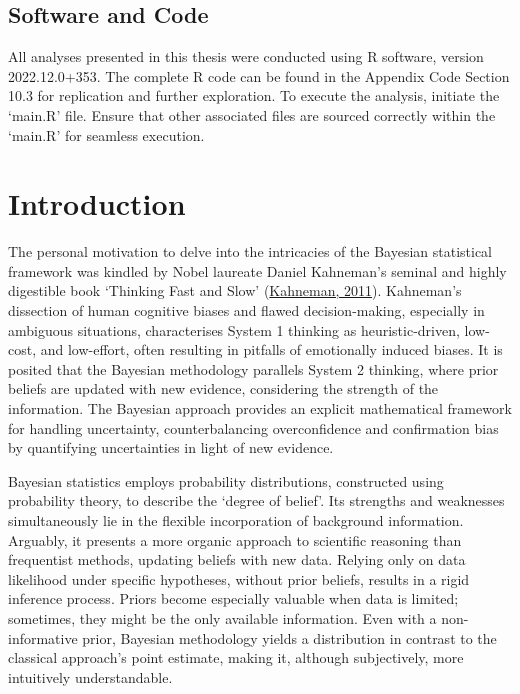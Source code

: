 \documentclass[
  11pt,
]{article}
\begin{document}
\newpage

\subsection*{\LARGE Software and Code}

All analyses presented in this thesis were conducted using R software,
version 2022.12.0+353. The complete R code can be found in the Appendix
Code Section 10.3 for replication and further exploration. To execute
the analysis, initiate the `main.R' file. Ensure that other associated
files are sourced correctly within the `main.R' for seamless execution.

\newpage

\tableofcontents

\newpage

\listoffigures

\newpage

\listoftables

\newpage

\section{Introduction}

The personal motivation to delve into the intricacies of the Bayesian
statistical framework was kindled by Nobel laureate Daniel Kahneman's
seminal and highly digestible book `Thinking Fast and Slow'
(\protect\hyperlink{ref-Kahneman2011}{Kahneman, 2011}). Kahneman's
dissection of human cognitive biases and flawed decision-making,
especially in ambiguous situations, characterises System 1 thinking as
heuristic-driven, low-cost, and low-effort, often resulting in pitfalls
of emotionally induced biases. It is posited that the Bayesian
methodology parallels System 2 thinking, where prior beliefs are updated
with new evidence, considering the strength of the information. The
Bayesian approach provides an explicit mathematical framework for
handling uncertainty, counterbalancing overconfidence and confirmation
bias by quantifying uncertainties in light of new evidence.

Bayesian statistics employs probability distributions, constructed using
probability theory, to describe the `degree of belief'. Its strengths
and weaknesses simultaneously lie in the flexible incorporation of
background information. Arguably, it presents a more organic approach to
scientific reasoning than frequentist methods, updating beliefs with new
data. Relying only on data likelihood under specific hypotheses, without
prior beliefs, results in a rigid inference process. Priors become
especially valuable when data is limited; sometimes, they might be the
only available information. Even with a non-informative prior, Bayesian
methodology yields a distribution in contrast to the classical
approach's point estimate, making it, although subjectively, more
intuitively understandable.
\end{document}
